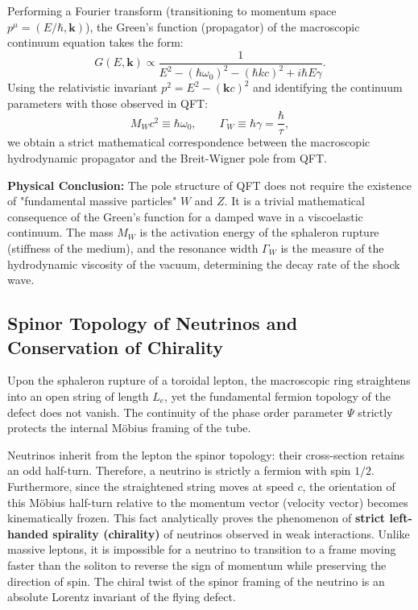 \documentclass[11pt,a4paper]{article}
\begin{document}
	Performing a Fourier transform (transitioning to momentum space $p^\mu = (E/\hbar, \mathbf{k})$), the Green's function (propagator) of the macroscopic continuum equation takes the form:
	\begin{equation}
		G(E, \mathbf{k}) \propto \frac{1}{E^2 - (\hbar\omega_0)^2 - (\hbar k c)^2 + i \hbar E \gamma}.
	\end{equation}
	Using the relativistic invariant $p^2 = E^2 - (\mathbf{k}c)^2$ and identifying the continuum parameters with those observed in QFT:
	\begin{equation}
		M_W c^2 \equiv \hbar \omega_0, \qquad \Gamma_W \equiv \hbar \gamma = \frac{\hbar}{\tau},
	\end{equation}
	we obtain a strict mathematical correspondence between the macroscopic hydrodynamic propagator and the Breit-Wigner pole from QFT. 
	
	\textbf{Physical Conclusion:} The pole structure of QFT does not require the existence of "fundamental massive particles" $W$ and $Z$. It is a trivial mathematical consequence of the Green's function for a damped wave in a viscoelastic continuum. The mass $M_W$ is the activation energy of the sphaleron rupture (stiffness of the medium), and the resonance width $\Gamma_W$ is the measure of the hydrodynamic viscosity of the vacuum, determining the decay rate of the shock wave. 
	
\subsection{Spinor Topology of Neutrinos and Conservation of Chirality}
	Upon the sphaleron rupture of a toroidal lepton, the macroscopic ring straightens into an open string of length $L_e$, yet the fundamental fermion topology of the defect does not vanish. The continuity of the phase order parameter $\Psi$ strictly protects the internal Möbius framing of the tube. 

Neutrinos inherit from the lepton the spinor topology: their cross-section retains an odd half-turn. Therefore, a neutrino is strictly a fermion with spin $1/2$. Furthermore, since the straightened string moves at speed $c$, the orientation of this Möbius half-turn relative to the momentum vector (velocity vector) becomes kinematically frozen. 
This fact analytically proves the phenomenon of \textbf{strict left-handed spirality (chirality)} of neutrinos observed in weak interactions. Unlike massive leptons, it is impossible for a neutrino to transition to a frame moving faster than the soliton to reverse the sign of momentum while preserving the direction of spin. The chiral twist of the spinor framing of the neutrino is an absolute Lorentz invariant of the flying defect.
\end{document}
